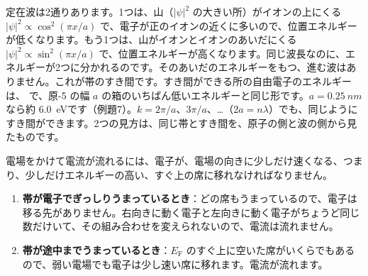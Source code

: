定在波は2通りあります。1つは、山（$|\psi|^2$ の大きい所）がイオンの上にくる $|\psi|^2\propto\cos^2(\pi x/a)$ で、電子が正のイオンの近くに多いので、位置エネルギーが低くなります。もう1つは、山がイオンとイオンのあいだにくる $|\psi|^2\propto\sin^2(\pi x/a)$ で、位置エネルギーが高くなります。同じ波長なのに、エネルギーが2つに分かれるのです。そのあいだのエネルギーをもつ、進む波はありません。これが帯のすき間です。すき間ができる所の自由電子のエネルギーは、
\label{ph:原-8:gapE}で、原-5 の幅 $a$ の箱のいちばん低いエネルギーと同じ形です。$a=\qty{0.25}{nm}$ なら約 \qty{6.0}{eV}です（例題7）。$k=2\pi/a$、$3\pi/a$、…（$2a=n\lambda$）でも、同じようにすき間ができます。2つの見方は、同じ帯とすき間を、原子の側と波の側から見たものです。

\label{ph:原-8:sec8}
電場をかけて電流が流れるには、電子が、電場の向きに少しだけ速くなる、つまり、少しだけエネルギーの高い、すぐ上の席に移れなければなりません。

\begin{enumerate}[label={\bkcircled{\arabic*}}, leftmargin=2.4\zw, itemsep=1pt, topsep=2pt]
\item \textbf{帯が電子でぎっしりうまっているとき}：どの席もうまっているので、電子は移る先がありません。右向きに動く電子と左向きに動く電子がちょうど同じ数だけいて、その組み合わせを変えられないので、電流は流れません。
\item \textbf{帯が途中までうまっているとき}：$E_{\mathrm F}$ のすぐ上に空いた席がいくらでもあるので、弱い電場でも電子は少し速い席に移れます。電流が流れます。
\end{enumerate}

